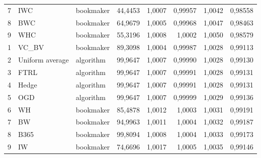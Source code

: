 {\begin{longtable}{@{}rllrrrrr@{}}
7 & IWC & bookmaker & 44,4453 & 1,0007 & 0,99957 & 1,0042 & 0,98558 \\
8 & BWC & bookmaker & 64,9679 & 1,0005 & 0,99968 & 1,0047 & 0,98463 \\
9 & WHC & bookmaker & 55,3196 & 1,0008 & 1,0002 & 1,0050 & 0,98579 \\
1 & VC\_BV & bookmaker & 89,3098 & 1,0004 & 0,99987 & 1,0028 & 0,99113 \\
2 & Uniform average & algorithm & 99,9647 & 1,0007 & 0,99990 & 1,0028 & 0,99130 \\
3 & FTRL & algorithm & 99,9647 & 1,0007 & 0,99991 & 1,0028 & 0,99131 \\
4 & Hedge & algorithm & 99,9647 & 1,0007 & 0,99991 & 1,0028 & 0,99131 \\
5 & OGD & algorithm & 99,9647 & 1,0007 & 0,99999 & 1,0029 & 0,99136 \\
6 & WH & bookmaker & 85,4878 & 1,0012 & 1,0003 & 1,0031 & 0,99191 \\
7 & BW & bookmaker & 94,9963 & 1,0011 & 1,0004 & 1,0032 & 0,99187 \\
8 & B365 & bookmaker & 99,8094 & 1,0008 & 1,0004 & 1,0033 & 0,99173 \\
9 & IW & bookmaker & 74,6696 & 1,0017 & 1,0005 & 1,0035 & 0,99146 \\
\end{longtable}
}

